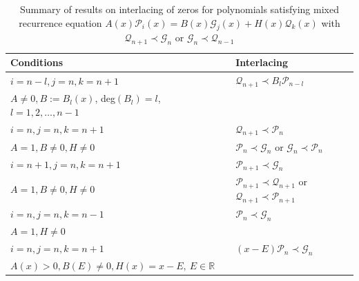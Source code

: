 \documentclass[final,3p,times,12pt]{elsarticle}
\numberwithin{equation}{section}  %
\begin{document}
\begin{table}[ht]
	\centering
	\setlength{\tabcolsep}{20pt}  %
	\begin{tabular}{@{} >{\raggedright\arraybackslash}p{8cm} l @{}}
		\toprule
		\textbf{Conditions} & \textbf{Interlacing} \\
		\midrule
		$i=n-l, j=n, k=n+1$	 & $\mathcal{Q}_{n+1}\prec B_l\mathcal{P}_{n-l}$ \cite[Theorem 2.1]{Driver-Jordaan-JAT-2012}\\	
		$A\neq0 ,B:=B_l(x)${, deg$(B_l)=l$, $l=1,2,\dots,n-1$}\\
		\addlinespace[8pt]
		$i=n, j=n, k=n+1$	 & $\mathcal{Q}_{n+1}\prec\mathcal{P}_n$ \cite[Lemma 1.1]{Jordaan-Tookos-ANM-2009}\\ $A=1, B\neq0,H\neq0$&$\mathcal{P}_n\prec\mathcal{G}_n$ or $\mathcal{G}_n\prec\mathcal{P}_n$ \\ 
		
		\addlinespace[10pt]
		$i=n+1, j=n, k=n+1$	 & $\mathcal{P}_{n+1}\prec\mathcal{G}_n$\cite[Lemma 1.1]{Jordaan-Tookos-ANM-2009}\\ $A=1, B\neq0,H\neq0$&$\mathcal{P}_{n+1}\prec\mathcal{Q}_{n+1}$ or $\mathcal{Q}_{n+1}\prec\mathcal{P}_{n+1}$ \\ 
		
		
		\addlinespace[12pt]
		$i=n, j=n, k=n-1$& $\mathcal{P}_{n}\prec\mathcal{G}_n$ \cite[Lemma 1]{Tcheutia-Jooste-Koepf-ANM-2018}\\ $A=1, H\neq0$ \\ 
		
		\addlinespace[10pt]
		$i=n, j=n, k=n+1$	& $(x-E)\mathcal{P}_{n}\prec\mathcal{G}_n$ \cite[Theorem 2.1]{Jooste-Jordaan-Numeralg-2025}\\ $A(x)>0, B(E)\neq0, H(x)=x-E,~ E\in \mathbb{R}$ \\ 
		
		\bottomrule
	\end{tabular}
	\caption{\label{Summary-Mixed-recurrence}Summary of results on interlacing of zeros for polynomials satisfying mixed recurrence equation $A(x)\mathcal{P}_i(x)=B(x)\mathcal{G}_j(x)+H(x)\mathcal{Q}_k(x)$ with $\mathcal{Q}_{n+1}\prec\mathcal{G}_n$ or $\mathcal{G}_n\prec\mathcal{Q}_{n-1}$}
\end{table}

 
\end{document}
